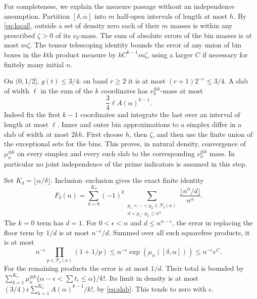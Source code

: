 \documentclass[10pt]{article}
\theoremstyle{remark}
\begin{document}
For completeness, we explain the measure passage without an independence
assumption. Partition $[\delta,\alpha]$ into $m$ half-open intervals of
length at most $h$. By \eqref{eq:local}, outside a set of density zero
each of their $m$ masses is within any prescribed $\zeta>0$ of its
$\nu_\delta$-mass. The sum of absolute errors of the bin masses is
at most $m\zeta$. The tensor telescoping identity bounds the error
of any union of bin boxes in the $k$th product measure by
$kC^{k-1}m\zeta$, using a larger $C$ if necessary for finitely many
initial $n$.

On $(0,1/2]$, $g(t)\leq3/4$: on band $r\geq2$ it is at most
$(r+1)2^{-r}\leq3/4$. A slab of width $\ell$ in the sum of the
$k$ coordinates has $\nu_\delta^{\otimes k}$-mass at most
\begin{equation}\label{eq:slab}
 \frac34\ell A(\alpha)^{k-1}.
\end{equation}
Indeed fix the first $k-1$ coordinates and integrate the last over an
interval of length at most $\ell$. Inner and outer bin approximations
to a simplex differ in a slab of width at most $2kh$. First choose
$h$, then $\zeta$, and then use the finite union of the exceptional
sets for the bins. This proves, in natural density, convergence of
$\mu_n^{\otimes k}$ on every simplex and every such slab to the
corresponding $\nu_\delta^{\otimes k}$ mass. In particular no joint
independence of the prime indicators is assumed in this step.

Set $K_\delta=\lfloor\alpha/\delta\rfloor$. Inclusion--exclusion gives
the exact finite identity
\begin{equation}\label{eq:sieve}
 F_\delta(n)=\sum_{k=0}^{K_\delta}(-1)^k
 \sum_{\substack{p_1<\cdots<p_k\in\mathcal P_\delta(n)\\d=p_1\cdots p_k\leq n^\alpha}}
 \frac{\lfloor n^\alpha/d\rfloor}{n^\alpha}.
\end{equation}
The $k=0$ term has $d=1$. For $0<\epsilon<\alpha$ and
$d\leq n^{\alpha-\epsilon}$, the error in replacing the floor term
by $1/d$ is at most $n^{-\epsilon}/d$. Summed over all such squarefree
products, it is at most
\begin{equation}\label{eq:floorerror}
 n^{-\epsilon}\prod_{p\in\mathcal P_\delta(n)}(1+1/p)
 \leq n^{-\epsilon}\exp(\mu_n([\delta,\alpha]))\leq n^{-\epsilon}e^C.
\end{equation}
For the remaining products the error is at most $1/d$. Their total
is bounded by
$\sum_{k=1}^{K_\delta}\mu_n^{\otimes k}
\{\alpha-\epsilon<\sum t_i\leq\alpha\}/k!$.
Its limit in density is at most
$(3/4)\epsilon\sum_{k=1}^{K_\delta}A(\alpha)^{k-1}/k!$,
by \eqref{eq:slab}. This tends to zero with $\epsilon$.
\end{document}
